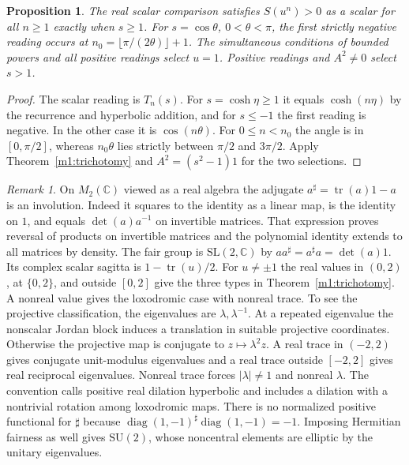 \documentclass[11pt,reqno]{amsart}
\newtheorem{proposition}[theorem]{Proposition}
\theoremstyle{definition}
\theoremstyle{remark}
\newtheorem{remark}[theorem]{Remark}
\numberwithin{equation}{section}
\begin{document}
\begin{proposition}\label{m1:time}
The real scalar comparison satisfies \(S(u^n)>0\) as a scalar
for all \(n\ge1\) exactly when \(s\ge1\).
For \(s=\cos\theta\), \(0<\theta<\pi\), the first strictly negative
reading occurs at \(n_0=\lfloor\pi/(2\theta)\rfloor+1\).
The simultaneous conditions of bounded powers and all positive
readings select \(u=1\). Positive readings and \(A^2\ne0\)
select \(s>1\).
\end{proposition}
\begin{proof}
The scalar reading is \(T_n(s)\). For \(s=\cosh\eta\ge1\) it
equals \(\cosh(n\eta)\) by the recurrence and hyperbolic addition,
and for \(s\le-1\) the first reading is negative. In the other
case it is \(\cos(n\theta)\). For \(0\le n<n_0\) the angle
is in \([0,\pi/2]\), whereas \(n_0\theta\) lies strictly between
\(\pi/2\) and \(3\pi/2\). Apply Theorem~\ref{m1:trichotomy}
and \(A^2=(s^2-1)1\) for the two selections.
\end{proof}

\begin{remark}\label{m1:matrix}
On \(M_2(\mathbb C)\) viewed as a real algebra the adjugate
\(a^\sharp=\operatorname{tr}(a)1-a\) is an involution.
Indeed it squares to the identity as a linear map, is the identity
on \(1\), and equals \(\det(a)a^{-1}\) on invertible matrices.
That expression proves reversal of products on invertible matrices
and the polynomial identity extends to all matrices by density.
The fair group is \(\mathrm{SL}(2,\mathbb C)\) by
\(aa^\sharp=a^\sharp a=\det(a)1\). Its complex scalar sagitta is
\(1-\operatorname{tr}(u)/2\). For \(u\ne\pm1\) the real values
in \((0,2)\), at \(\{0,2\}\), and outside \([0,2]\) give the three
types in Theorem~\ref{m1:trichotomy}. A nonreal value gives the
loxodromic case with nonreal trace. To see the projective
classification, the eigenvalues are \(\lambda,\lambda^{-1}\).
At a repeated eigenvalue the nonscalar Jordan block induces a
translation in suitable projective coordinates. Otherwise the
projective map is conjugate to \(z\mapsto\lambda^2 z\).
A real trace in \((-2,2)\) gives conjugate unit-modulus eigenvalues
and a real trace outside \([-2,2]\) gives real reciprocal
eigenvalues. Nonreal trace forces \(|\lambda|\ne1\) and nonreal
\(\lambda\). The convention calls positive real dilation hyperbolic and
includes a dilation with a nontrivial rotation among loxodromic maps.
There is no normalized positive functional for \(\sharp\) because
\(\operatorname{diag}(1,-1)^\sharp\operatorname{diag}(1,-1)=-1\).
Imposing Hermitian fairness as well gives \(\mathrm{SU}(2)\), whose
noncentral elements are elliptic by the unitary eigenvalues.
\end{remark}
\end{document}
